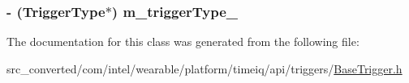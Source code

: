 \subsubsection[{m\+\_\+trigger\+Type\+\_\+}]{\setlength{\rightskip}{0pt plus 5cm}-\/ ({\bf Trigger\+Type}$\ast$) m\+\_\+trigger\+Type\+\_\+}\label{interface_base_trigger_af93564489b271d7463f86355fb154a51}


The documentation for this class was generated from the following file\+:\begin{DoxyCompactItemize}
\item 
src\+\_\+converted/com/intel/wearable/platform/timeiq/api/triggers/\hyperlink{_base_trigger_8h}{Base\+Trigger.\+h}\end{DoxyCompactItemize}
